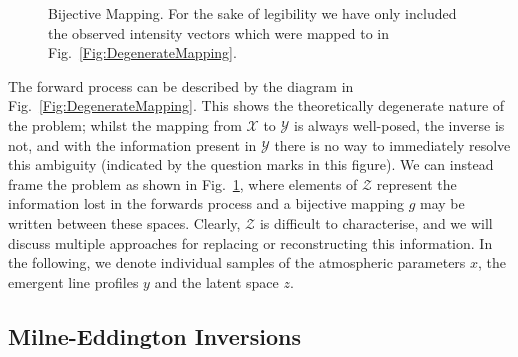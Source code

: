 \begin{figure}
\caption{Bijective Mapping. For the sake of legibility we have only included the observed intensity vectors which were mapped to in Fig.~\ref{Fig:DegenerateMapping}.}
\label{Fig:BijectiveMapping}
\end{figure}

The forward process can be described by the diagram in Fig.~\ref{Fig:DegenerateMapping}.
This shows the theoretically degenerate nature of the problem; whilst the mapping from $\mathcal{X}$ to $\mathcal{Y}$ is always well-posed, the inverse is not, and with the information present in $\mathcal{Y}$ there is no way to immediately resolve this ambiguity (indicated by the question marks in this figure).
We can instead frame the problem as shown in Fig.~\ref{Fig:BijectiveMapping}, where elements of $\mathcal{Z}$ represent the information lost in the forwards process and a bijective mapping $g$ may be written between these spaces.
Clearly, $\mathcal{Z}$ is difficult to characterise, and we will discuss multiple approaches for replacing or reconstructing this information.
In the following, we denote individual samples of the atmospheric parameters $x$, the emergent line profiles $y$ and the latent space $z$.

\subsection{Milne-Eddington Inversions}

